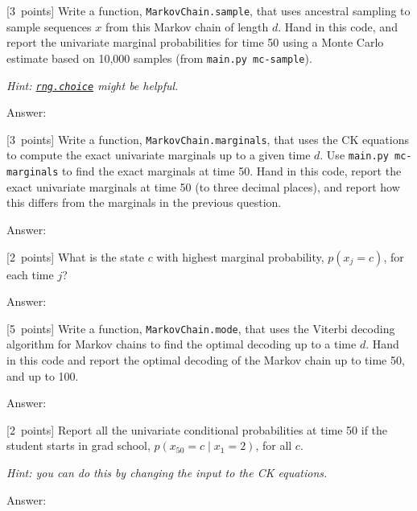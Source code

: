 \documentclass{article}
\newcommand{\ask}[1]{\textcolor{question}{#1}}
\newenvironment{answer}{\par\begingroup\color{answer}Answer: }{\endgroup}
\newcommand{\pts}[1]{\textcolor{points}{[#1~points]}}
\newcommand{\hint}[1]{\textcolor{black!60!white}{\emph{Hint: #1}}}
\newcommand{\TODO}{\color{red}{TODO}}
\begin{document}
\begin{qlist}
\item \pts{3}
    Write a function, \texttt{MarkovChain.sample}, that uses ancestral sampling to sample sequences $x$ from this Markov chain of length $d$. \ask{Hand in this code, and report the univariate marginal probabilities for time 50 using a Monte Carlo estimate based on 10,000 samples (from \texttt{main.py mc-sample}).}

\hint{\href{https://numpy.org/doc/stable/reference/random/generated/numpy.random.Generator.choice.html}{\texttt{rng.choice}} might be helpful.}

\begin{answer}\TODO\end{answer}

\item \pts{3}
    Write a function, \texttt{MarkovChain.marginals}, that uses the CK equations to compute the exact univariate marginals up to a given time $d$. Use \texttt{main.py mc-marginals} to find the exact marginals at time 50. \ask{Hand in this code, report the exact univariate marginals at time 50 (to three decimal places), and report how this differs from the marginals in the previous question.}
\begin{answer}\TODO\end{answer}

\item \pts{2}
    \ask{What is the state $c$ with highest marginal probability, $p(x_j = c)$, for each time $j$?}
\begin{answer}\TODO\end{answer}

\item \pts{5}
    Write a function, \texttt{MarkovChain.mode}, that uses the Viterbi decoding algorithm for Markov chains to find the optimal decoding up to a time $d$.
    \ask{Hand in this code and report the optimal decoding of the Markov chain up to time 50, and up to 100.}
\begin{answer}\TODO\end{answer}

\item \pts{2}
    \ask{Report all the univariate conditional probabilities at time 50 if the student starts in grad school, $p(x_{50} = c \mid x_1 = 2)$, for all $c$}.

\hint{you can do this by changing the input to the CK equations.}

\begin{answer}\TODO\end{answer}


\end{qlist}
\end{document}
